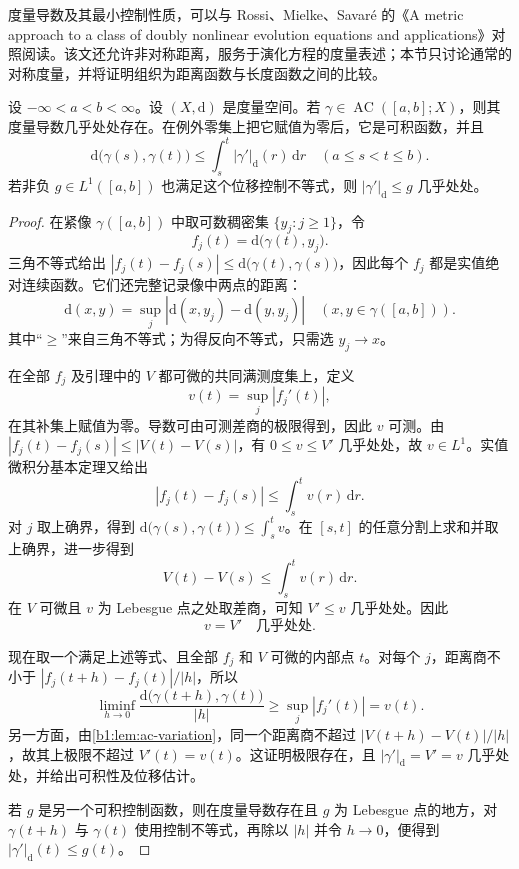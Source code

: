 度量导数及其最小控制性质，可以与 Rossi、Mielke、Savar\'e 的《A metric approach to a class of doubly nonlinear evolution equations and applications》\cite[Section 2.1, Proposition 2.2]{Rossi2008Metric}对照阅读。该文还允许非对称距离，服务于演化方程的度量表述；本节只讨论通常的对称度量，并将证明组织为距离函数与长度函数之间的比较。

\begin{theorem}[度量导数的存在性]
\label{b1:thm:metric-derivative}
设 \(-\infty<a<b<\infty\)。设 \((X,\mathrm d)\) 是度量空间。若 \(\gamma\in\operatorname{AC}([a,b];X)\)，则其度量导数几乎处处存在。在例外零集上把它赋值为零后，它是可积函数，并且
\[
\mathrm{d}\bigl(\gamma(s),\gamma(t)\bigr)
\leq\int_s^t|\gamma'|_{\mathrm d}(r)\,\mathrm dr
\quad(a\leq s<t\leq b).
\]
若非负 \(g\in L^1([a,b])\) 也满足这个位移控制不等式，则 \(|\gamma'|_{\mathrm d}\leq g\) 几乎处处。
\end{theorem}
\begin{proof}
在紧像 \(\gamma([a,b])\) 中取可数稠密集 \(\{y_j:j\geq1\}\)，令
\[
f_j(t)=\mathrm{d}\bigl(\gamma(t),y_j\bigr).
\]
三角不等式给出 \(|f_j(t)-f_j(s)|\leq \mathrm{d}\bigl(\gamma(t),\gamma(s)\bigr)\)，因此每个 \(f_j\) 都是实值绝对连续函数。它们还完整记录像中两点的距离：
\[
\mathrm{d}(x,y)=\sup_j|\mathrm{d}(x,y_j)-\mathrm{d}(y,y_j)|
\quad(x,y\in\gamma([a,b])).
\]
其中“\(\geq\)”来自三角不等式；为得反向不等式，只需选 \(y_j\to x\)。

在全部 \(f_j\) 及引理中的 \(V\) 都可微的共同满测度集上，定义
\[
v(t)=\sup_j|f_j'(t)|,
\]
在其补集上赋值为零。导数可由可测差商的极限得到，因此 \(v\) 可测。由 \(|f_j(t)-f_j(s)|\leq|V(t)-V(s)|\)，有 \(0\leq v\leq V'\) 几乎处处，故 \(v\in L^1\)。实值微积分基本定理又给出
\[
|f_j(t)-f_j(s)|\leq\int_s^t v(r)\,\mathrm dr.
\]
对 \(j\) 取上确界，得到 \(\mathrm{d}\bigl(\gamma(s),\gamma(t)\bigr)\leq\int_s^tv\)。在 \([s,t]\) 的任意分割上求和并取上确界，进一步得到
\[
V(t)-V(s)\leq\int_s^t v(r)\,\mathrm dr.
\]
在 \(V\) 可微且 \(v\) 为 Lebesgue 点之处取差商，可知 \(V'\leq v\) 几乎处处。因此
\[
v=V'\quad\text{几乎处处}.
\]

现在取一个满足上述等式、且全部 \(f_j\) 和 \(V\) 可微的内部点 \(t\)。对每个 \(j\)，距离商不小于 \(|f_j(t+h)-f_j(t)|/|h|\)，所以
\[
\liminf_{h\to0}\frac{\mathrm{d}\bigl(\gamma(t+h),\gamma(t)\bigr)}{|h|}
\geq\sup_j|f_j'(t)|=v(t).
\]
另一方面，由\cref{b1:lem:ac-variation}，同一个距离商不超过 \(|V(t+h)-V(t)|/|h|\)，故其上极限不超过 \(V'(t)=v(t)\)。这证明极限存在，且 \(|\gamma'|_{\mathrm d}=V'=v\) 几乎处处，并给出可积性及位移估计。

若 \(g\) 是另一个可积控制函数，则在度量导数存在且 \(g\) 为 Lebesgue 点的地方，对 \(\gamma(t+h)\) 与 \(\gamma(t)\) 使用控制不等式，再除以 \(|h|\) 并令 \(h\to0\)，便得到 \(|\gamma'|_{\mathrm d}(t)\leq g(t)\)。
\end{proof}

